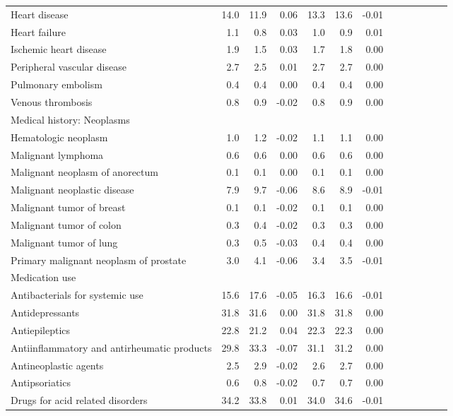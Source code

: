 \documentclass[11pt,]{article}
\begin{document}
\begin{longtable}{lrrrrrrrrrrrr}
      Heart disease & 14.0 & 11.9 &  0.06 & 13.3 & 13.6 & -0.01 \\ 
      Heart failure &  1.1 &  0.8 &  0.03 &  1.0 &  0.9 &  0.01 \\ 
      Ischemic heart disease &  1.9 &  1.5 &  0.03 &  1.7 &  1.8 &  0.00 \\ 
      Peripheral vascular disease &  2.7 &  2.5 &  0.01 &  2.7 &  2.7 &  0.00 \\ 
      Pulmonary embolism &  0.4 &  0.4 &  0.00 &  0.4 &  0.4 &  0.00 \\ 
      Venous thrombosis &  0.8 &  0.9 & -0.02 &  0.8 &  0.9 &  0.00 \\ 
  Medical history: Neoplasms &    &    &     &    &    &     \\ 
      Hematologic neoplasm &  1.0 &  1.2 & -0.02 &  1.1 &  1.1 &  0.00 \\ 
      Malignant lymphoma &  0.6 &  0.6 &  0.00 &  0.6 &  0.6 &  0.00 \\ 
      Malignant neoplasm of anorectum &  0.1 &  0.1 &  0.00 &  0.1 &  0.1 &  0.00 \\ 
      Malignant neoplastic disease &  7.9 &  9.7 & -0.06 &  8.6 &  8.9 & -0.01 \\ 
      Malignant tumor of breast &  0.1 &  0.1 & -0.02 &  0.1 &  0.1 &  0.00 \\ 
      Malignant tumor of colon &  0.3 &  0.4 & -0.02 &  0.3 &  0.3 &  0.00 \\ 
      Malignant tumor of lung &  0.3 &  0.5 & -0.03 &  0.4 &  0.4 &  0.00 \\ 
      Primary malignant neoplasm of prostate &  3.0 &  4.1 & -0.06 &  3.4 &  3.5 & -0.01 \\ 
  Medication use &    &    &     &    &    &     \\ 
      Antibacterials for systemic use & 15.6 & 17.6 & -0.05 & 16.3 & 16.6 & -0.01 \\ 
      Antidepressants & 31.8 & 31.6 &  0.00 & 31.8 & 31.8 &  0.00 \\ 
      Antiepileptics & 22.8 & 21.2 &  0.04 & 22.3 & 22.3 &  0.00 \\ 
      Antiinflammatory and antirheumatic products & 29.8 & 33.3 & -0.07 & 31.1 & 31.2 &  0.00 \\ 
      Antineoplastic agents &  2.5 &  2.9 & -0.02 &  2.6 &  2.7 &  0.00 \\ 
      Antipsoriatics &  0.6 &  0.8 & -0.02 &  0.7 &  0.7 &  0.00 \\ 
      Drugs for acid related disorders & 34.2 & 33.8 &  0.01 & 34.0 & 34.6 & -0.01 \\ 

\end{longtable}
\end{document}
